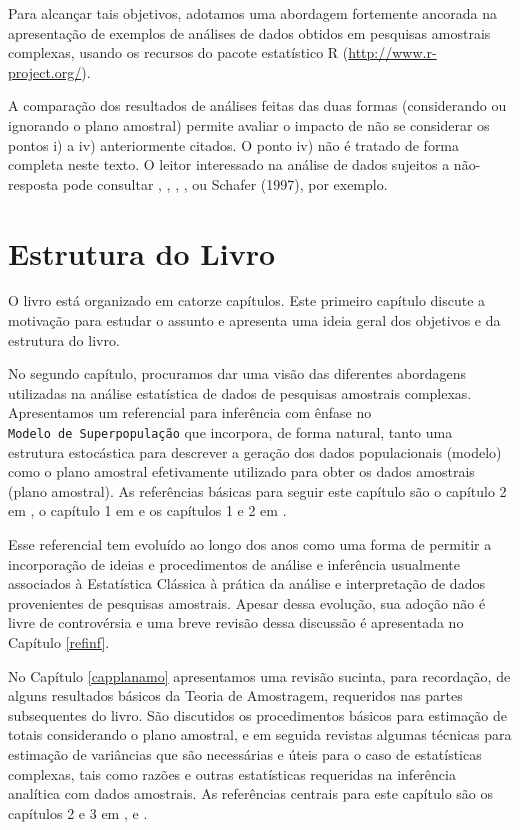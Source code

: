 \documentclass[]{book}
\theoremstyle{definition}
\theoremstyle{definition}
\theoremstyle{definition}
\theoremstyle{remark}
\begin{document}
Para alcançar tais objetivos, adotamos uma abordagem fortemente ancorada
na apresentação de exemplos de análises de dados obtidos em pesquisas
amostrais complexas, usando os recursos do pacote estatístico R
(\url{http://www.r-project.org/}).

A comparação dos resultados de análises feitas das duas formas
(considerando ou ignorando o plano amostral) permite avaliar o impacto
de não se considerar os pontos i) a iv) anteriormente citados. O ponto
iv) não é tratado de forma completa neste texto. O leitor interessado na
análise de dados sujeitos a não-resposta pode consultar
\citep{kalton83a}, \citep{LR2002}, \citep{Rubin87}, \citep{SSW92}, ou
Schafer (1997), por exemplo.

\section{Estrutura do Livro}\label{estrutura-do-livro}

O livro está organizado em catorze capítulos. Este primeiro capítulo
discute a motivação para estudar o assunto e apresenta uma ideia geral
dos objetivos e da estrutura do livro.

No segundo capítulo, procuramos dar uma visão das diferentes abordagens
utilizadas na análise estatística de dados de pesquisas amostrais
complexas. Apresentamos um referencial para inferência com ênfase no
\texttt{Modelo\ de\ Superpopulação} que incorpora, de forma natural,
tanto uma estrutura estocástica para descrever a geração dos dados
populacionais (modelo) como o plano amostral efetivamente utilizado para
obter os dados amostrais (plano amostral). As referências básicas para
seguir este capítulo são o capítulo 2 em \citep{Silva}, o capítulo 1 em
\citep{SHS89} e os capítulos 1 e 2 em \citep{CHSK2003}.

Esse referencial tem evoluído ao longo dos anos como uma forma de
permitir a incorporação de ideias e procedimentos de análise e
inferência usualmente associados à Estatística Clássica à prática da
análise e interpretação de dados provenientes de pesquisas amostrais.
Apesar dessa evolução, sua adoção não é livre de controvérsia e uma
breve revisão dessa discussão é apresentada no Capítulo \ref{refinf}.

No Capítulo \ref{capplanamo} apresentamos uma revisão sucinta, para
recordação, de alguns resultados básicos da Teoria de Amostragem,
requeridos nas partes subsequentes do livro. São discutidos os
procedimentos básicos para estimação de totais considerando o plano
amostral, e em seguida revistas algumas técnicas para estimação de
variâncias que são necessárias e úteis para o caso de estatísticas
complexas, tais como razões e outras estatísticas requeridas na
inferência analítica com dados amostrais. As referências centrais para
este capítulo são os capítulos 2 e 3 em \citep{SSW92}, \citep{W85} e
\citep{cochran}.
\end{document}

